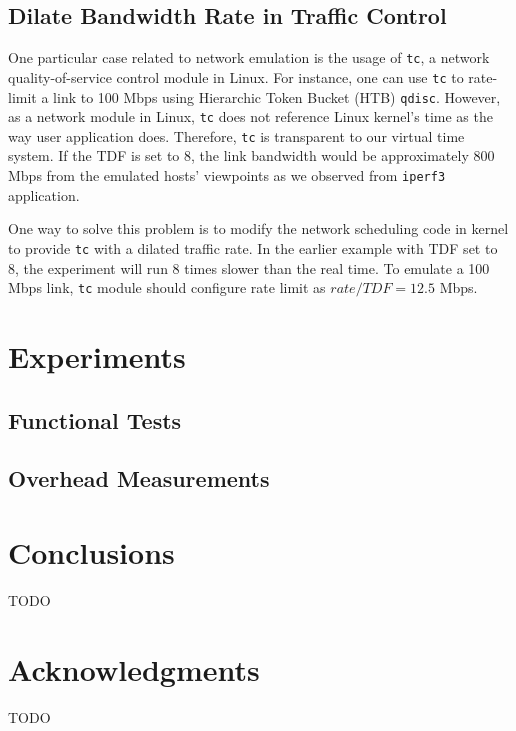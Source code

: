 \documentclass{acm_proc_article-sp}
\begin{document}
\subsection{Dilate Bandwidth Rate in Traffic Control}
One particular case related to network emulation is the usage of \texttt{tc}, a network quality-of-service control module in Linux\cite{trafficcontrol}. 
For instance, one can use \texttt{tc} to rate-limit a link to 100 Mbps using Hierarchic Token Bucket (HTB) \texttt{qdisc}. 
However, as a network module in Linux, \texttt{tc} does not reference Linux kernel's time as the way user application does. 
Therefore, \texttt{tc} is transparent to our virtual time system. 
If the TDF is set to 8, the link bandwidth would be approximately 800 Mbps from the emulated hosts' viewpoints as we observed from \texttt{iperf3} application.

One way to solve this problem is to modify the network scheduling code in kernel to provide \texttt{tc} with a dilated traffic rate. 
In the earlier example with TDF set to 8, the experiment will run 8 times slower than the real time. To emulate a 100 Mbps link, \texttt{tc} module should configure rate limit as $rate/TDF=12.5$ Mbps. 

\section{Experiments}
\subsection{Functional Tests}
\subsection{Overhead Measurements}

\section{Conclusions}
TODO

\section{Acknowledgments}
TODO
%


%
%
\balancecolumns
\end{document}
